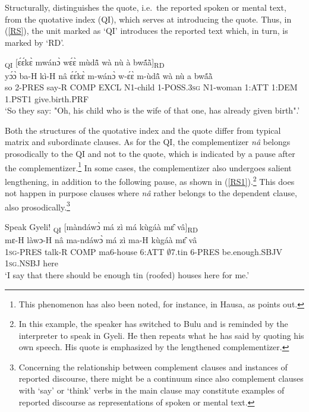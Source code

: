 Structurally, \citet{guldemann2008} distinguishes the quote, i.e.\ the reported spoken or mental text, from the quotative index (QI), which serves at introducing the quote. Thus, in (\ref{RS}), the unit marked as `QI' introduces the reported text which, in turn, is marked by `RD'.

\begin{exe}
\ex\label{RS}
  \glll  [yɔ́ɔ̀ bá kí {\bfseries nâ}]\textsubscript{QI} [ɛ́ɛ́kɛ̀ mwánɔ̀ wɛ́ɛ̀ mùdã̂ wà nù à bwã́ã̀]\textsubscript{RD}\\
         yɔ́ɔ̀ ba-H kì-H nâ ɛ́ɛ́kɛ̀ m-wánɔ̀ w-ɛ́ɛ̀ m-ùdã̂ wà nù a bwã́ã̀ \\
         so 2-PRES say-R COMP EXCL N1-child 1-POSS.3\textsc{sg} N1-woman 1:ATT 1:DEM 1.PST1 give.birth.PRF \\
    \trans `So they say: "Oh, his child who is the wife of that one, has already given birth".'
\end{exe}

Both the structures of the quotative index and the quote differ from typical matrix and subordinate clauses. As for the QI, the complementizer {\itshape nâ} belongs prosodically to the QI and not to the quote, which is indicated by a pause after the complementizer.\footnote{This phenomenon has also been noted, for instance, in Hausa, as \citet[236]{guldemann2008} points out.} In some cases, the complementizer also undergoes salient lengthening, in addition to the following pause, as shown in (\ref{RS1}).\footnote{In this example, the speaker has switched to Bulu and is reminded by the interpreter to speak in Gyeli. He then repeats what he has said by quoting his own speech. His quote is emphasized by the lengthened complementizer.} This does not happen in purpose clauses where {\itshape nâ} rather belongs to the dependent clause, also prosodically.\footnote{Concerning the relationship between complement clauses and instances of reported discourse, there might be a continuum since also complement clauses with `say' or `think' verbs in the main clause may constitute examples of reported discourse as representations of spoken or mental text.} 


\begin{exe} 
\ex\label{RS1} Speak Gyeli!
  \glll  [mɛ́ làwɔ́ {\bfseries náà}]\textsubscript{QI} [màndáwɔ̀ má zì má kùgáà mɛ̂ vâ]\textsubscript{RD} \\
         mɛ-H làwɔ-H nâ ma-ndáwɔ̀ má zì ma-H kùgáà mɛ̂ vâ \\
            1\textsc{sg}-PRES talk-R COMP ma6-house 6:ATT $\emptyset$7.tin 6-PRES be.enough.SBJV 1\textsc{sg}.NSBJ here \\
    \trans `I say that there should be enough tin (roofed) houses here for me.'
\end{exe}

